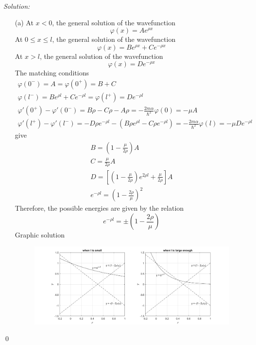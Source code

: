 \documentclass[12pt,a4paper]{article}
\newenvironment{sol}
    {\emph{Solution:}
    }
    {
    \qed
    }
\begin{document}
\begin{sol}
\begin{itemize}
\item[(a)] At $x<0$, the general solution of the wavefunction
\begin{equation}
\varphi(x)=Ae^{\rho x}
\end{equation}
At $0\leq x\leq l$, the general solution of the wavefunction
\begin{equation}
\varphi(x)=Be^{\rho x}+Ce^{-\rho x}
\end{equation}
At $x>l$, the general solution of the wavefunction
\begin{equation}
\varphi(x)=De^{-\rho x}
\end{equation}
The matching conditions
\begin{gather}
\varphi(0^-)=A=\varphi(0^+)=B+C\\
\varphi(l^-)=Be^{\rho l}+Ce^{-\rho l}=\varphi(l^+)=De^{-\rho l}\\
\varphi'(0^+)-\varphi'(0^-)=B\rho-C\rho-A\rho=-\frac{2m\alpha}{\hbar^2}\varphi(0)=-\mu A\\
\varphi'(l^+)-\varphi'(l^-)=-D\rho e^{-\rho l}-(B\rho e^{\rho l}-C\rho e^{-\rho l})=-\frac{2m\alpha}{\hbar^2}\varphi(l)=-\mu De^{-\rho l}
\end{gather}
give
\begin{gather}
B=\left(1-\frac{\mu}{2\rho}\right)A\\
C=\frac{\mu}{2\rho}A\\
D=\left[\left(1-\frac{\mu}{2\rho}\right)e^{2\rho l}+\frac{\mu}{2\rho}\right]A\\
e^{-\rho l}=\left(1-\frac{2\rho}{\mu}\right)^2
\end{gather}
Therefore, the possible energies are given by the relation
\begin{equation}
e^{-\rho l}=\pm\left(1-\frac{2\rho}{\mu}\right)
\end{equation}
Graphic solution
\begin{figure}[h]
\centering
\includegraphics[scale=0.5]{problem_5.png}

\end{figure}
\end{itemize}
\end{sol}
\end{document}
